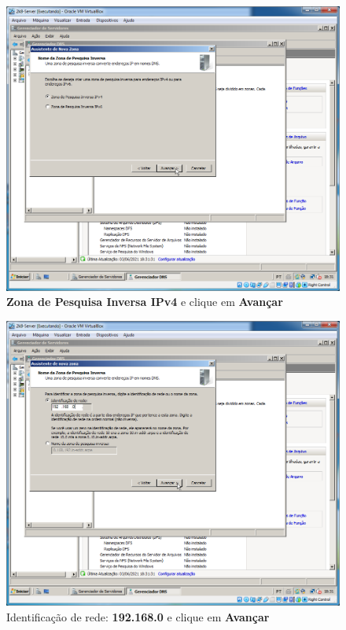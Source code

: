 \documentclass[10pt]{article}
\begin{document}
\begin{figure}[H]
    \centering
    \caption{\textbf{Zona de Pesquisa Inversa IPv4} e clique em \textbf{Avançar}}
    \label{fig:DNS023}
    \includegraphics[width=\linewidth]{images/windows_server/dns/023.png}
\end{figure}
\begin{figure}[H]
    \centering
    \caption{Identificação de rede: \textbf{192.168.0} e clique em \textbf{Avançar}}
    \label{fig:DNS024}
    \includegraphics[width=\linewidth]{images/windows_server/dns/024.png}
\end{figure}
\end{document}
